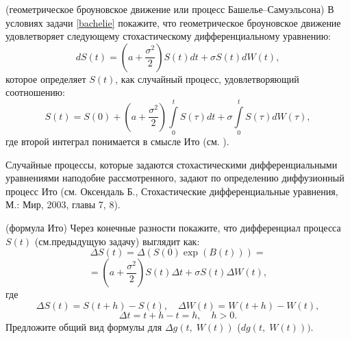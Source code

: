 \begin{problem} \label{geomB}(геометрическое броуновское движение или процесс 
Башелье--Самуэльсона) В условиях задачи \ref{bachelie} покажите, что геометрическое 
броуновское движение удовлетворяет следующему стохастическому 
дифференциальному уравнению:
\[
dS\left( t \right)=\left( {a+\frac{\sigma ^2}{2}} \right)S\left( t 
\right)dt+\sigma S\left( t \right)dW\left( t \right),
\]
которое определяет $S\left( t \right)$, как случайный процесс, 
удовлетворяющий соотношению:
\[
S\left( t \right)=S\left( 0 \right)+\left( {a+\frac{\sigma ^2}{2}} 
\right)\int\limits_0^t {S\left( \tau \right)dt} +\sigma \int\limits_0^t 
{S\left( \tau \right)dW\left( \tau \right)},
\]
где второй интеграл понимается в смысле Ито (см.  \cite{101}).
\end{problem}
\begin{remark} Случайные процессы, которые задаются 
стохастическими дифференциальными уравнениями наподобие рассмотренного, 
задают по определению диффузионный процесс Ито (см. Оксендаль Б., 
Стохастические дифференциальные уравнения, М.: Мир, 2003, главы 7, 8).
\end{remark}
\begin{problem} (формула Ито) Через конечные разности покажите, что дифференциал процесса $S(t)$ (см.предыдущую задачу) выглядит как: 
\[
\Delta S\left( t \right)=\Delta \left( {S\left( 0 \right)\exp \left( 
{B\left( t \right)} \right)} \right)=
\]
\[
=\left( {a+\frac{\sigma ^2}{2}} \right)S\left( t \right)\Delta t+\sigma 
S\left( t \right)\Delta W\left( t \right),
\]
где
\[
\Delta S\left( t \right)=S\left( {t+h} \right)-S\left( t \right),
\quad
\Delta W\left( t \right)=W\left( {t+h} \right)-W\left( t \right),
\]
\[
\Delta t=t+h-t=h,
\quad
h>0.
\]
Предложите общий вид формулы для $\Delta g\left( {t,\;W\left( t \right)} 
\right)$ ($dg\left( {t,\;W\left( t \right)} \right))$.
\end{problem}

